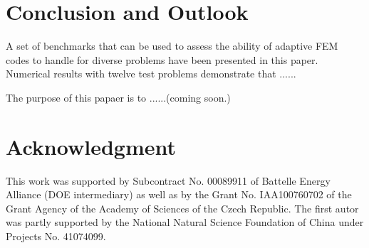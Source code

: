 \section{Conclusion and Outlook}
\label{sec:conclusion}

A set of benchmarks that can be used to assess the
ability of adaptive FEM codes to handle for diverse
problems have been presented in this paper.
Numerical results with twelve test problems demonstrate 
that ......

The purpose of this papaer is to ......(coming soon.)

\section{Acknowledgment}

This work was supported by Subcontract No. 00089911 of Battelle
Energy Alliance (DOE intermediary) as well as by the
Grant No. IAA100760702 of the Grant Agency of the Academy
of Sciences of the Czech Republic. The first autor was partly
supported by the National Natural Science Foundation
of China under Projects No. 41074099.
